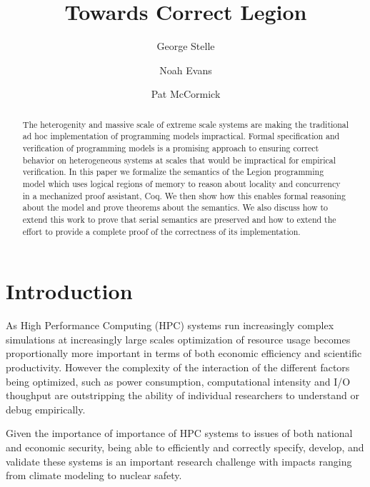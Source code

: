 \documentclass[sigconf]{acmart}
\begin{document}
\title{Towards Correct Legion}
\author{George Stelle}

\author{Noah Evans}

\author{Pat McCormick}

\begin{abstract}
The heterogenity and massive scale of extreme scale systems are making the
traditional ad hoc implementation of programming models impractical. Formal
specification and verification of programming models is a promising approach to
ensuring correct behavior on heterogeneous systems at scales that would be
impractical for empirical verification. In this paper we formalize the
semantics of the Legion programming model which uses logical regions of memory
to reason about locality and concurrency in a mechanized proof assistant, Coq.
We then show how this enables formal reasoning about the model and prove
theorems about the semantics. We also discuss how to extend this work to prove
that serial semantics are preserved and how to extend the effort to provide a
complete proof of the correctness of its implementation.
\end{abstract}

\maketitle

\section{Introduction}
As High Performance Computing (HPC) systems run increasingly complex
simulations at increasingly large scales optimization of resource usage becomes
proportionally more important in terms of both economic efficiency and
scientific productivity. However the complexity of the interaction of the
different factors being optimized, such as power consumption, computational
intensity and I/O thoughput are outstripping the ability of individual
researchers to understand or debug empirically.

Given the importance of importance of HPC systems to issues of both national
and economic security, being able to efficiently and correctly specify,
develop, and validate these systems is an important research challenge with
impacts ranging from climate modeling to nuclear safety.
\end{document}

